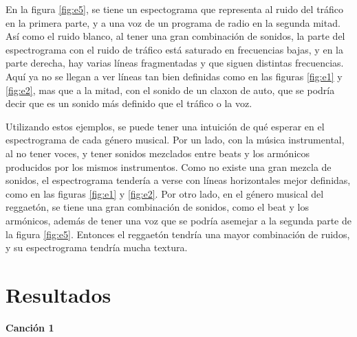 \documentclass[12pt, letterpaper]{article}
\begin{document}
\noindent En la figura \ref{fig:e5}, se tiene un espectograma que representa al
ruido del tráfico en la primera parte, y a una voz de un programa de radio en la segunda
mitad. Así como el ruido blanco, al tener una gran combinación de sonidos, la
parte del espectrograma con el ruido de tráfico está saturado en frecuencias bajas,
y en la parte derecha, hay varias líneas fragmentadas y que siguen distintas frecuencias.
Aquí ya no se llegan a ver líneas tan bien definidas como en las figuras
\ref{fig:e1} y \ref{fig:e2}, mas que a la mitad, con el
sonido de un claxon de auto, que se podría decir que es un sonido más definido
que el tráfico o la voz. \medskip

\noindent Utilizando estos ejemplos, se puede tener una intuición de qué esperar
en el espectrograma de cada género musical. Por un lado, con la música instrumental,
al no tener voces, y tener sonidos mezclados entre beats y los armónicos producidos
por los mismos instrumentos. Como no existe una gran mezcla de sonidos, el espectrograma
tendería a verse con líneas horizontales mejor definidas, como en las figuras
\ref{fig:e1} y \ref{fig:e2}. Por otro lado, en el género musical del reggaetón, se tiene
una gran combinación de sonidos, como el beat y los armónicos, además de tener una voz
que se podría asemejar a la segunda parte de la figura \ref{fig:e5}. Entonces el reggaetón
tendría una mayor combinación de ruidos, y su espectrograma tendría mucha textura.

\section{Resultados}

\textbf{\large{Canción 1}}
\end{document}
